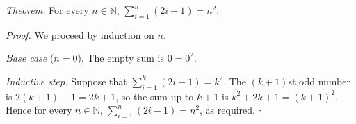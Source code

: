 \textit{Theorem.} For every $n \in \mathbb{N}$, $\sum_{i=1}^{n} (2i - 1) = n^{2}$.

\textit{Proof.} We proceed by induction on $n$.

\textit{Base case} ($n = 0$). The empty sum is $0 = 0^{2}$.

\textit{Inductive step.} Suppose that $\sum_{i=1}^{k} (2i - 1) = k^{2}$.
The $(k + 1)$st odd number is $2(k + 1) - 1 = 2k + 1$, so the sum up to $k + 1$ is $k^{2} + 2k + 1 = (k + 1)^{2}$.
Hence for every $n \in \mathbb{N}$, $\sum_{i=1}^{n} (2i - 1) = n^{2}$, as required. \hfill$\square$